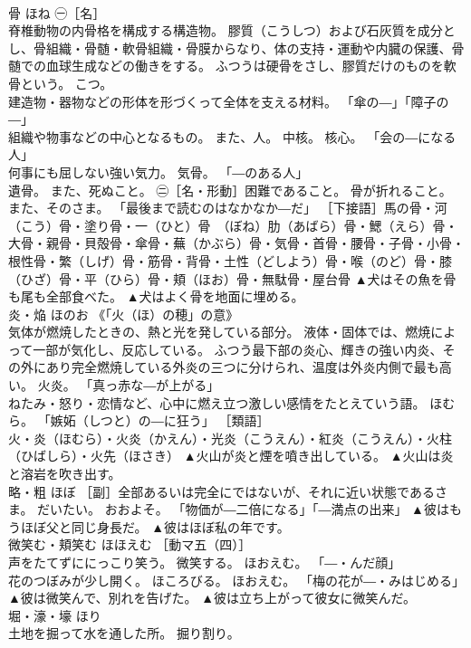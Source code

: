 \documentclass[8pt]{extreport}
\begin{document}
\begin{CJK}{UTF8}{min}
\\	骨	ほね	㊀［名］ 
\\	脊椎動物の内骨格を構成する構造物。 膠質（こうしつ）および石灰質を成分とし、骨組織・骨髄・軟骨組織・骨膜からなり、体の支持・運動や内臓の保護、骨髄での血球生成などの働きをする。 ふつうは硬骨をさし、膠質だけのものを軟骨という。 こつ。 
\\	建造物・器物などの形体を形づくって全体を支える材料。 「傘の―」「障子の―」 
\\	組織や物事などの中心となるもの。 また、人。 中核。 核心。 「会の―になる人」 
\\	何事にも屈しない強い気力。 気骨。 「―のある人」 
\\	遺骨。 また、死ぬこと。 ㊁［名・形動］困難であること。 骨が折れること。 また、そのさま。 「最後まで読むのはなかなか―だ」 ［下接語］馬の骨・河（こう）骨・塗り骨・一（ひと）骨　（ぼね）肋（あばら）骨・鰓（えら）骨・大骨・親骨・貝殻骨・傘骨・蕪（かぶら）骨・気骨・首骨・腰骨・子骨・小骨・根性骨・繁（しげ）骨・筋骨・背骨・土性（どしよう）骨・喉（のど）骨・膝（ひざ）骨・平（ひら）骨・頬（ほお）骨・無駄骨・屋台骨	▲犬はその魚を骨も尾も全部食べた。 ▲犬はよく骨を地面に埋める。
\\	炎・焔	ほのお	《「火（ほ）の穂」の意》 
\\	気体が燃焼したときの、熱と光を発している部分。 液体・固体では、燃焼によって一部が気化し、反応している。 ふつう最下部の炎心、輝きの強い内炎、その外にあり完全燃焼している外炎の三つに分けられ、温度は外炎内側で最も高い。 火炎。 「真っ赤な―が上がる」 
\\	ねたみ・怒り・恋情など、心中に燃え立つ激しい感情をたとえていう語。 ほむら。 「嫉妬（しつと）の―に狂う」 ［類語］
\\	火・炎（ほむら）・火炎（かえん）・光炎（こうえん）・紅炎（こうえん）・火柱（ひばしら）・火先（ほさき）	▲火山が炎と煙を噴き出している。 ▲火山は炎と溶岩を吹き出す。
\\	略・粗	ほぼ	［副］全部あるいは完全にではないが、それに近い状態であるさま。 だいたい。 おおよそ。 「物価が―二倍になる」「―満点の出来」	▲彼はもうほぼ父と同じ身長だ。 ▲彼はほぼ私の年です。
\\	微笑む・頬笑む	ほほえむ	［動マ五（四）］ 
\\	声をたてずににっこり笑う。 微笑する。 ほおえむ。 「―・んだ顔」 
\\	花のつぼみが少し開く。 ほころびる。 ほおえむ。 「梅の花が―・みはじめる」	▲彼は微笑んで、別れを告げた。 ▲彼は立ち上がって彼女に微笑んだ。
\\	堀・濠・壕	ほり	
\\	土地を掘って水を通した所。 掘り割り。 

\end{CJK}
\end{document}
